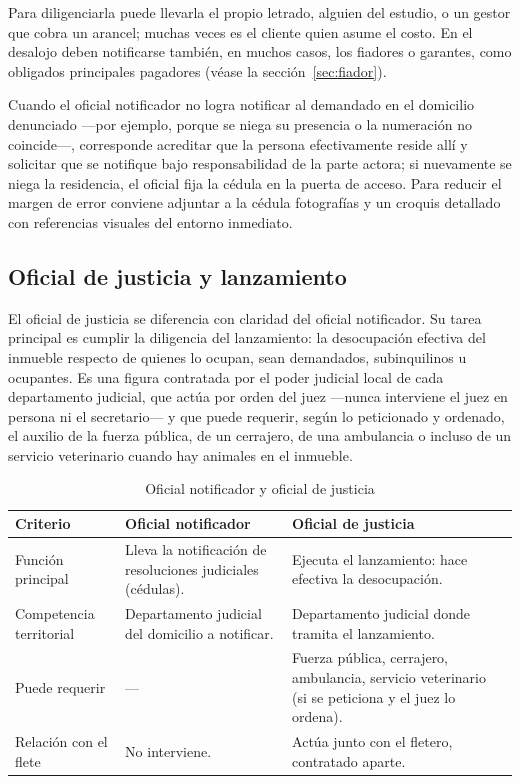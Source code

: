 \documentclass[12pt,oneside]{book}
\begin{document}
Para diligenciarla puede llevarla el propio letrado, alguien del estudio, o un gestor que cobra un arancel; muchas veces es el cliente quien asume el costo. En el desalojo deben notificarse también, en muchos casos, los fiadores o garantes, como obligados principales pagadores (véase la sección~\ref{sec:fiador}).

Cuando el oficial notificador no logra notificar al demandado en el domicilio denunciado ---por ejemplo, porque se niega su presencia o la numeración no coincide---, corresponde acreditar que la persona efectivamente reside allí y solicitar que se notifique bajo responsabilidad de la parte actora; si nuevamente se niega la residencia, el oficial fija la cédula en la puerta de acceso. Para reducir el margen de error conviene adjuntar a la cédula fotografías y un croquis detallado con referencias visuales del entorno inmediato.

\subsection{Oficial de justicia y lanzamiento}

El oficial de justicia se diferencia con claridad del oficial notificador. Su tarea principal es cumplir la diligencia del lanzamiento: la desocupación efectiva del inmueble respecto de quienes lo ocupan, sean demandados, subinquilinos u ocupantes. Es una figura contratada por el poder judicial local de cada departamento judicial, que actúa por orden del juez ---nunca interviene el juez en persona ni el secretario--- y que puede requerir, según lo peticionado y ordenado, el auxilio de la fuerza pública, de un cerrajero, de una ambulancia o incluso de un servicio veterinario cuando hay animales en el inmueble.

\begin{table}[H]
\centering
\caption{Oficial notificador y oficial de justicia}
\begin{tabularx}{\textwidth}{>{\raggedright\arraybackslash}p{} >{\raggedright\arraybackslash}X >{\raggedright\arraybackslash}X}
\toprule
\textbf{Criterio} & \textbf{Oficial notificador} & \textbf{Oficial de justicia} \\
\midrule
Función principal & Lleva la notificación de resoluciones judiciales (cédulas). & Ejecuta el lanzamiento: hace efectiva la desocupación. \\
Competencia territorial & Departamento judicial del domicilio a notificar. & Departamento judicial donde tramita el lanzamiento. \\
Puede requerir & --- & Fuerza pública, cerrajero, ambulancia, servicio veterinario (si se peticiona y el juez lo ordena). \\
Relación con el flete & No interviene. & Actúa junto con el fletero, contratado aparte. \\
\bottomrule
\end{tabularx}
\end{table}
\end{document}

